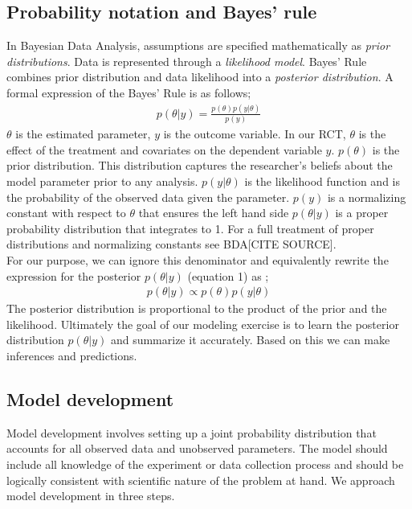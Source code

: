 \documentclass{article}
\begin{document}
\subsection{Probability notation and Bayes' rule}
In Bayesian Data Analysis, assumptions are specified mathematically as \textit{prior distributions}.  Data is represented through a \textit{likelihood model}. Bayes' Rule combines prior distribution and data likelihood into a \textit{posterior distribution}.  A formal expression of the Bayes' Rule is as follows;
\begin{align}
{p(\theta|y) = \frac{ p(\theta) p(y |\theta)}{p(y)}}
\end{align}
$\theta$ is the estimated parameter, $y$ is the outcome variable. In our RCT, $\theta$ is the effect of the treatment and covariates on the dependent variable $y$. $p(\theta)$ is the prior distribution. This distribution captures the researcher's beliefs about the model parameter prior to any analysis. $p(y | \theta)$ is the likelihood function and is the probability of the observed data given the parameter.  $p(y)$ is a normalizing constant with respect to $\theta$ that ensures the left hand side $p(\theta | y)$ is a proper probability distribution that integrates to 1. For a full treatment of proper distributions and normalizing constants see BDA[CITE SOURCE]. \\
For our purpose, we can ignore this denominator and equivalently rewrite the expression for the posterior $p(\theta | y)$ (equation 1) as ;
 \begin{align}
 p(\theta | y) \propto p(\theta) p(y |\theta)
 \end{align}
The posterior distribution is proportional to the product of the prior and the likelihood. Ultimately the goal of our modeling exercise is to learn the posterior distribution $p(\theta|y)$ and summarize it accurately. Based on this we can make inferences and predictions.

\subsection{Model development}
Model development involves setting up a joint probability distribution that accounts for all observed data and unobserved parameters. The model should include all knowledge of the experiment or data collection process and should be logically consistent with scientific nature of the problem at hand. We approach model development in three steps.
\end{document}
